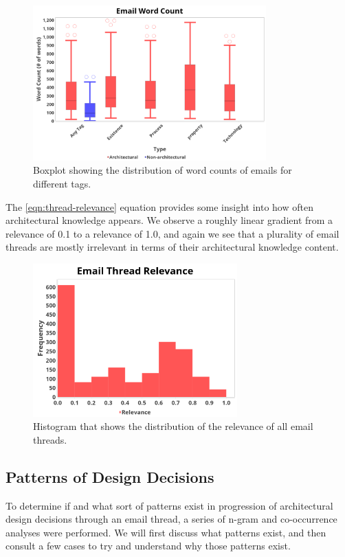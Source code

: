\documentclass[a4paper, 12pt]{article}
\begin{document}
		\begin{figure}[H]
			\centering
			\includegraphics[width=0.8\textwidth]{report/word_count.png}
			\caption{Boxplot showing the distribution of word counts of emails for different tags.}
			\label{fig:wordcount}
		\end{figure}
		
		The \eqref{eqn:thread-relevance} equation provides some insight into how often architectural knowledge appears. We observe a roughly linear gradient from a relevance of 0.1 to a relevance of 1.0, and again we see that a plurality of email threads are mostly irrelevant in terms of their architectural knowledge content.
		
		\begin{figure}[H]
			\centering
			\includegraphics[width=0.7\textwidth]{report/email_thread_relevance_hist.png}
			\caption{Histogram that shows the distribution of the relevance of all email threads.}
			\label{fig:threadrelevance}
		\end{figure}
	
	\subsection{Patterns of Design Decisions}
		To determine if and what sort of patterns exist in progression of architectural design decisions through an email thread, a series of n-gram and co-occurrence analyses were performed. We will first discuss what patterns exist, and then consult a few cases to try and understand why those patterns exist.
		
\end{document}
